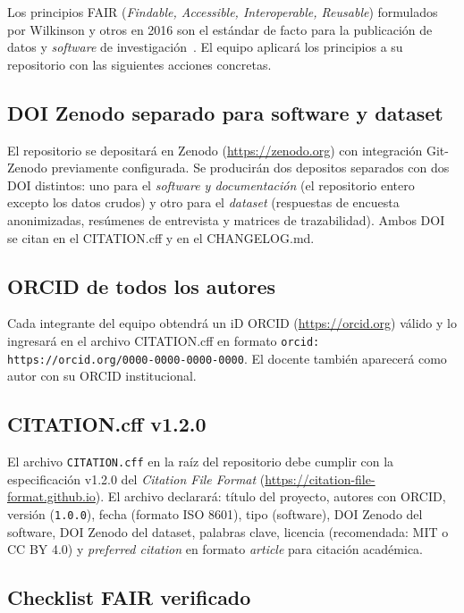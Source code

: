 \documentclass[11pt,a4paper]{article}
\begin{document}
Los principios FAIR (\emph{Findable, Accessible, Interoperable, Reusable}) formulados por Wilkinson y otros en 2016 son el est\'andar de facto para la publicaci\'on de datos y \emph{software} de investigaci\'on~\cite{wilkinson2016fair}. El equipo aplicar\'a los principios a su repositorio con las siguientes acciones concretas.

\subsection{DOI Zenodo separado para software y dataset}

El repositorio se depositar\'a en Zenodo (\url{https://zenodo.org}) con integraci\'on Git-Zenodo previamente configurada. Se producir\'an dos depositos separados con dos DOI distintos: uno para el \emph{software y documentaci\'on} (el repositorio entero excepto los datos crudos) y otro para el \emph{dataset} (respuestas de encuesta anonimizadas, res\'umenes de entrevista y matrices de trazabilidad). Ambos DOI se citan en el CITATION.cff y en el CHANGELOG.md.

\subsection{ORCID de todos los autores}

Cada integrante del equipo obtendr\'a un iD ORCID (\url{https://orcid.org}) v\'alido y lo ingresar\'a en el archivo CITATION.cff en formato \texttt{orcid: https://orcid.org/0000-0000-0000-0000}. El docente tambi\'en aparecer\'a como autor con su ORCID institucional.

\subsection{CITATION.cff v1.2.0}

El archivo \texttt{CITATION.cff} en la ra\'iz del repositorio debe cumplir con la especificaci\'on v1.2.0 del \emph{Citation File Format} (\url{https://citation-file-format.github.io}). El archivo declarar\'a: t\'itulo del proyecto, autores con ORCID, versi\'on (\texttt{1.0.0}), fecha (formato ISO 8601), tipo (software), DOI Zenodo del software, DOI Zenodo del dataset, palabras clave, licencia (recomendada: MIT o CC BY 4.0) y \emph{preferred citation} en formato \emph{article} para citaci\'on acad\'emica.

\subsection{Checklist FAIR verificado}
\end{document}
